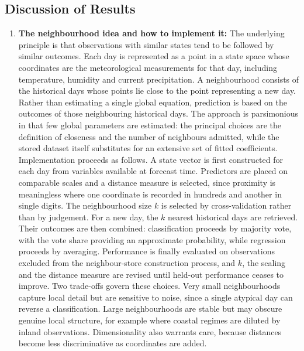 \documentclass[conference]{IEEEtran}
\begin{document}
\subsection{Discussion of Results}
\begin{enumerate}
    \item \textbf{The neighbourhood idea and how to implement it:} The underlying principle is that observations with similar states tend to be followed by similar outcomes. Each day is represented as a point in a state space whose coordinates are the meteorological measurements for that day, including temperature, humidity and current precipitation. A neighbourhood consists of the historical days whose points lie close to the point representing a new day. Rather than estimating a single global equation, prediction is based on the outcomes of those neighbouring historical days. The approach is parsimonious in that few global parameters are estimated: the principal choices are the definition of closeness and the number of neighbours admitted, while the stored dataset itself substitutes for an extensive set of fitted coefficients. Implementation proceeds as follows. A state vector is first constructed for each day from variables available at forecast time. Predictors are placed on comparable scales and a distance measure is selected, since proximity is meaningless where one coordinate is recorded in hundreds and another in single digits. The neighbourhood size $k$ is selected by cross-validation rather than by judgement. For a new day, the $k$ nearest historical days are retrieved. Their outcomes are then combined: classification proceeds by majority vote, with the vote share providing an approximate probability, while regression proceeds by averaging. Performance is finally evaluated on observations excluded from the neighbour-store construction process, and $k$, the scaling and the distance measure are revised until held-out performance ceases to improve. Two trade-offs govern these choices. Very small neighbourhoods capture local detail but are sensitive to noise, since a single atypical day can reverse a classification. Large neighbourhoods are stable but may obscure genuine local structure, for example where coastal regimes are diluted by inland observations. Dimensionality also warrants care, because distances become less discriminative as coordinates are added.


\end{enumerate}
\end{document}
